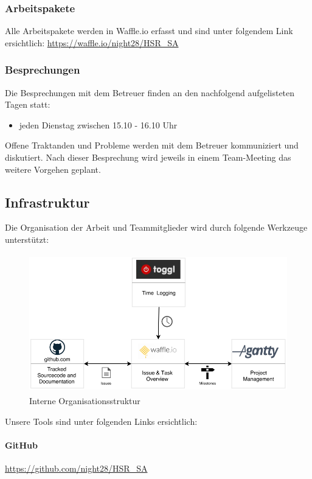 \subsubsection{Arbeitspakete}
Alle Arbeitspakete werden in Waffle.io erfasst und sind unter folgendem Link ersichtlich:
\href{Waffle.io}{https://waffle.io/night28/HSR\_SA}
\subsubsection{Besprechungen}
Die Besprechungen mit dem Betreuer finden an den nachfolgend aufgelisteten Tagen statt:
\begin{itemize}
	\item jeden Dienstag zwischen 15.10 - 16.10 Uhr
\end{itemize}

Offene Traktanden und Probleme werden mit dem Betreuer kommuniziert und diskutiert. Nach dieser Besprechung wird jeweils in einem Team-Meeting das weitere Vorgehen geplant.


\subsection{Infrastruktur}
Die Organisation der Arbeit und Teammitglieder wird durch folgende Werkzeuge unterstützt:

\begin{figure}[H]
	\centering
	\includegraphics[height=6cm]{img/InterneOrganisationsstruktur.png}
	\caption{Interne Organisationsstruktur}
	\label{fig:Interne Organisationsstruktur}
\end{figure} 

Unsere Tools sind unter folgenden Links ersichtlich:
\paragraph{GitHub} \href{https://github.com/night28/HSR_SA}{https://github.com/night28/HSR\_SA} 

